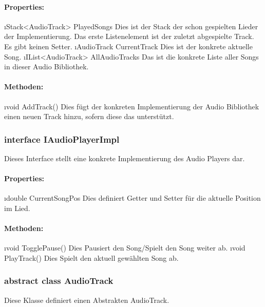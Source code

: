 \documentclass[../entwurf.tex]{subfiles}
\begin{document}
				\paragraph{Properties:}
					\begin{itemize}
						\i{Stack<AudioTrack> PlayedSongs} Dies ist der Stack der schon gespielten Lieder der Implementierung.
						Das erste Listenelement ist der zuletzt abgespielte Track. Es gibt keinen Setter.
						\i{AudioTrack CurrentTrack} Dies ist der konkrete aktuelle Song.
						\i{IList<AudioTrack> AllAudioTracks} Das ist die konkrete Liste aller Songs in dieser Audio Bibliothek.
					\end{itemize}
				\paragraph{Methoden:}
					\begin{itemize}
						\i{void AddTrack()} Dies fügt der konkreten Implementierung der Audio Bibliothek einen neuen Track hinzu, sofern
						diese das unterstützt.
					\end{itemize}
			\subsubsection{interface IAudioPlayerImpl}
				Dieses Interface stellt eine konkrete Implementierung des Audio Players dar.
				\paragraph{Properties:}
					\begin{itemize}
						\i{double CurrentSongPos} Dies definiert Getter und Setter für die aktuelle Position im Lied.
					\end{itemize}
				\paragraph{Methoden:}
					\begin{itemize}
						\i{void TogglePause()} Dies Pausiert den Song/Spielt den Song weiter ab.
						\i{void PlayTrack()} Dies Spielt den aktuell gewählten Song ab.
					\end{itemize}
			\subsubsection{abstract class AudioTrack}
				Diese Klasse definiert einen Abstrakten AudioTrack.
\end{document}

